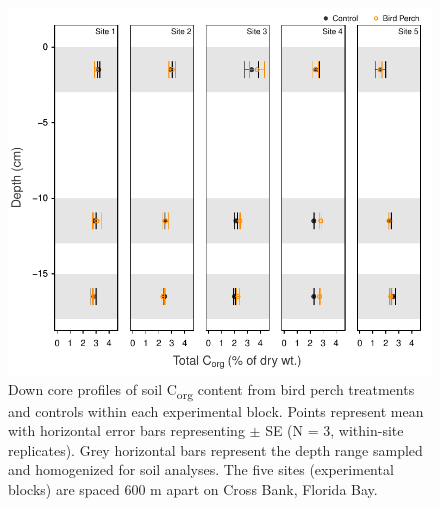 \begin{figure}
  \centering
  \includegraphics[width=.9\textwidth]{Figures/chapter1/fig7}
\caption[Down core profiles of soil C\textsubscript{org} content from bird perch treatments and controls within each experimental block. Points represent mean with horizontal error bars representing $\pm$ SE (N = 3, within-site replicates). Grey horizontal bars represent the depth range sampled and homogenized for soil analyses. The five sites (experimental blocks) are spaced 600 m apart on Cross Bank, Florida Bay]{Down core profiles of soil C\textsubscript{org} content from bird perch treatments and controls within each experimental block. Points represent mean with horizontal error bars representing $\pm$ SE (N = 3, within-site replicates). Grey horizontal bars represent the depth range sampled and homogenized for soil analyses. The five sites (experimental blocks) are spaced 600 m apart on Cross Bank, Florida Bay.}
  \label{fig:1fig7}
\end{figure}


